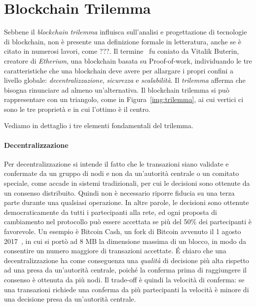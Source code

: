 \section{Blockchain Trilemma}
Sebbene il \emph{blockchain trilemma} influisca sull'analisi e progettazione di tecnologie di blockchain, non è presente una definizione formale in letteratura, anche se è citato in numerosi lavori, come ???. Il termine~\cite{ethfaqsharding} fu coniato da Vitalik Buterin, creatore di \emph{Etherium}, una blockchain basata su Proof-of-work, individuando le tre caratteristiche che una blockchain deve avere per allargare i propri confini a livello globale: \emph{decentralizzazione}, \emph{sicurezza} e \emph{scalabilità}. Il \emph{trilemma} afferma che bisogna rinunciare ad almeno un'alternativa. Il blockchain trilemma si può rappresentare con un triangolo, come in Figura~\ref{img:trilemma}, ai cui vertici ci sono le tre proprietà e in cui l'ottimo è il centro.

Vediamo in dettaglio i tre elementi fondamentali del trilemma.

\paragraph{Decentralizzazione}
Per decentralizzazione si intende il fatto che le transazioni siano validate e confermate da un gruppo di nodi e non da un'autorità centrale o un comitato speciale, come accade in sistemi tradizionali, per cui le decisioni sono ottenute da un consenso distribuito. Quindi non è necessario riporre fiducia su una terza parte durante una qualsiasi operazione. In altre parole, le decisioni sono ottenute democraticamente da tutti i partecipanti alla rete, ed ogni proposta di cambiamento nel protocollo può essere accettata se più del 50\% dei partecipanti è favorevole. Un esempio è Bitcoin Cash, un fork di Bitcoin avvenuto il 1 agosto 2017~\cite{bcash}, in cui si portò ad 8 MB la dimensione massima di un blocco, in modo da consentire un numero maggiore di transazioni accettate.
\'E chiaro che una decentralizzazione ha come conseguenza una \emph{qualità} di decisione più alta rispetto ad una presa da un'autorità centrale, poiché la conferma prima di raggiungere il consenso è ottenuta da più nodi. Il trade-off è quindi la velocità di conferma: se una transazioni richiede una conferma da più partecipanti la velocità è minore di una decisione presa da un'autorità centrale.


